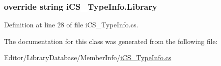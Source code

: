 \hypertarget{classi_c_s___type_info_a972c93a07539fc72c6466dccaf257cbc}{
\subsubsection[{Library}]{\setlength{\rightskip}{0pt plus 5cm}override string i\+C\+S\+\_\+\+Type\+Info.\+Library\hspace{0.3cm}{\ttfamily [get]}}}\label{classi_c_s___type_info_a972c93a07539fc72c6466dccaf257cbc}


Definition at line 28 of file i\+C\+S\+\_\+\+Type\+Info.\+cs.



The documentation for this class was generated from the following file\+:\begin{DoxyCompactItemize}
\item 
Editor/\+Library\+Database/\+Member\+Info/\hyperlink{i_c_s___type_info_8cs}{i\+C\+S\+\_\+\+Type\+Info.\+cs}\end{DoxyCompactItemize}
